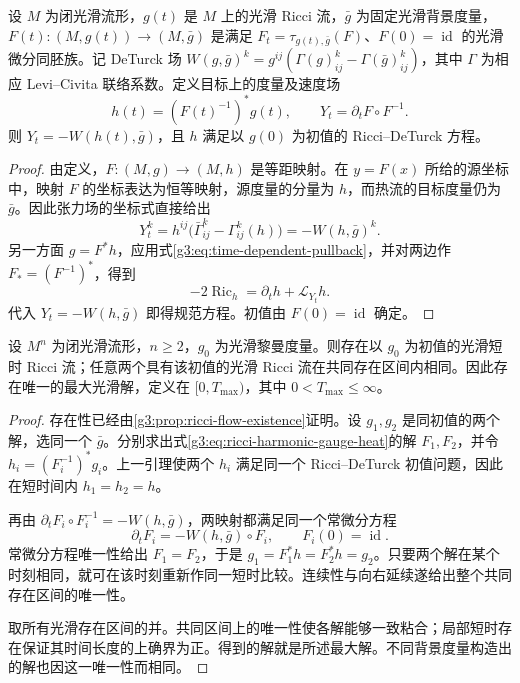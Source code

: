 \begin{lemma}\label{g3:lem:ricci-flow-to-deturck}
 设 \(M\) 为闭光滑流形，\(g(t)\) 是 \(M\) 上的光滑 Ricci 流，\(\bar g\) 为固定光滑背景度量，\(F(t):(M,g(t))\to(M,\bar g)\) 是满足 \(F_t=\tau_{g(t),\bar g}(F)\)、\(F(0)=\operatorname{id}\) 的光滑微分同胚族。记 DeTurck 场 \(W(g,\bar g)^k=g^{ij}(\Gamma(g)^k_{ij}-\Gamma(\bar g)^k_{ij})\)，其中 \(\Gamma\) 为相应 Levi--Civita 联络系数。定义目标上的度量及速度场
 \[
  h(t)=(F(t)^{-1})^*g(t),\qquad
  Y_t=\partial_tF\circ F^{-1}.
 \]
 则 \(Y_t=-W(h(t),\bar g)\)，且 \(h\) 满足以 \(g(0)\) 为初值的 Ricci--DeTurck 方程。
\end{lemma}
\begin{proof}
 由定义，\(F:(M,g)\to(M,h)\) 是等距映射。在 \(y=F(x)\) 所给的源坐标中，映射 \(F\) 的坐标表达为恒等映射，源度量的分量为 \(h\)，而热流的目标度量仍为 \(\bar g\)。因此张力场的坐标式直接给出
 \[
  Y_t^k=h^{ij}\bigl(\bar\Gamma^k_{ij}-\Gamma^k_{ij}(h)\bigr)
      =-W(h,\bar g)^k.
 \]
 另一方面 \(g=F^*h\)，应用式\eqref{g3:eq:time-dependent-pullback}，并对两边作 \(F_*=(F^{-1})^*\)，得到
 \[
  -2\operatorname{Ric}_h=\partial_th+\mathcal L_{Y_t}h.
 \]
 代入 \(Y_t=-W(h,\bar g)\) 即得规范方程。初值由 \(F(0)=\operatorname{id}\) 确定。
\end{proof}

\begin{theorem}\label{g3:thm:ricci-flow-short-time}
 设 \(M^n\) 为闭光滑流形，\(n\ge2\)，\(g_0\) 为光滑黎曼度量。则存在以 \(g_0\) 为初值的光滑短时 Ricci 流；任意两个具有该初值的光滑 Ricci 流在共同存在区间内相同。因此存在唯一的最大光滑解，定义在 \([0,T_{\max})\)，其中 \(0<T_{\max}\le\infty\)。
\end{theorem}
\begin{proof}
 存在性已经由\cref{g3:prop:ricci-flow-existence}证明。设 \(g_1,g_2\) 是同初值的两个解，选同一个 \(\bar g\)。分别求出式\eqref{g3:eq:ricci-harmonic-gauge-heat}的解 \(F_1,F_2\)，并令 \(h_i=(F_i^{-1})^*g_i\)。上一引理使两个 \(h_i\) 满足同一个 Ricci--DeTurck 初值问题，因此在短时间内 \(h_1=h_2=h\)。

 再由 \(\partial_tF_i\circ F_i^{-1}=-W(h,\bar g)\)，两映射都满足同一个常微分方程
 \[
  \partial_tF_i=-W(h,\bar g)\circ F_i,\qquad F_i(0)=\operatorname{id}.
 \]
 常微分方程唯一性给出 \(F_1=F_2\)，于是 \(g_1=F_1^*h=F_2^*h=g_2\)。只要两个解在某个时刻相同，就可在该时刻重新作同一短时比较。连续性与向右延续遂给出整个共同存在区间的唯一性。

 取所有光滑存在区间的并。共同区间上的唯一性使各解能够一致粘合；局部短时存在保证其时间长度的上确界为正。得到的解就是所述最大解。不同背景度量构造出的解也因这一唯一性而相同。
\end{proof}

